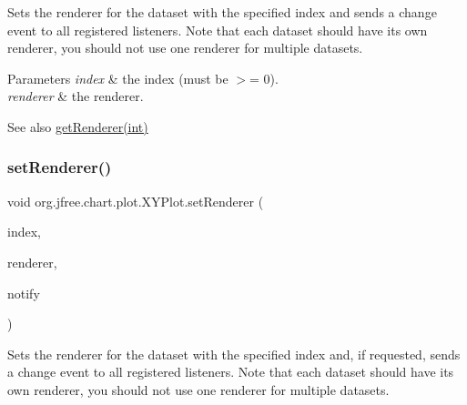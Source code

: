 Sets the renderer for the dataset with the specified index and sends a change event to all registered listeners. Note that each dataset should have its own renderer, you should not use one renderer for multiple datasets.


\begin{DoxyParams}{Parameters}
{\em index} & the index (must be $>$= 0). \\
\hline
{\em renderer} & the renderer.\\
\hline
\end{DoxyParams}
\begin{DoxySeeAlso}{See also}
\mbox{\hyperlink{classorg_1_1jfree_1_1chart_1_1plot_1_1_x_y_plot_a53b99134a5298b4aad9e602210a54896}{get\+Renderer(int)}} 
\end{DoxySeeAlso}
\mbox{\label{classorg_1_1jfree_1_1chart_1_1plot_1_1_x_y_plot_a7bfaa67a2524bc5d91afbd9a02ffff07}} 
\subsubsection{\texorpdfstring{set\+Renderer()}{setRenderer()}\hspace{0.1cm}{\footnotesize\ttfamily [3/3]}}
{\footnotesize\ttfamily void org.\+jfree.\+chart.\+plot.\+X\+Y\+Plot.\+set\+Renderer (\begin{DoxyParamCaption}\item[{int}]{index,  }\item[{\mbox{\hyperlink{interfaceorg_1_1jfree_1_1chart_1_1renderer_1_1xy_1_1_x_y_item_renderer}{X\+Y\+Item\+Renderer}}}]{renderer,  }\item[{boolean}]{notify }\end{DoxyParamCaption})}

Sets the renderer for the dataset with the specified index and, if requested, sends a change event to all registered listeners. Note that each dataset should have its own renderer, you should not use one renderer for multiple datasets.


